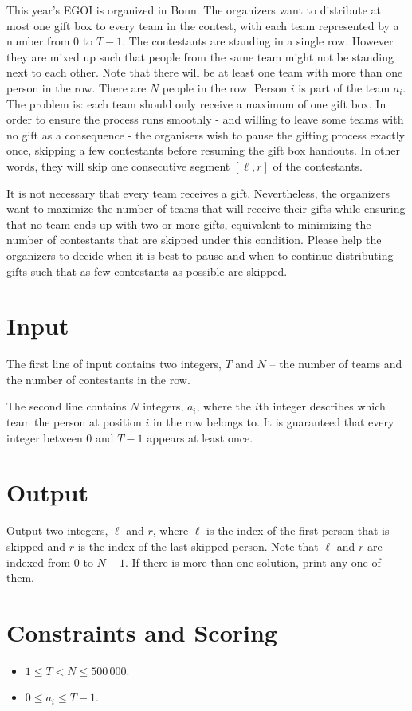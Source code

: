 
This year's EGOI is organized in Bonn.
The organizers want to distribute at most one gift box to every team in the contest, with each team represented by a number from $0$ to $T-1$.
The contestants are standing in a single row. However they are mixed up such that people from the same team might not be standing next to each other. Note that there will be at least one team with more than one person in the row. 
There are $N$ people in the row.
Person $i$ is part of the team $a_i$.
The problem is: each team should only receive a maximum of one gift box.
In order to ensure the process runs smoothly - and willing to leave some teams with no gift as a consequence - the organisers wish to pause the gifting process exactly once, skipping a few contestants before resuming the gift box handouts.
In other words, they will skip one consecutive segment $[\ell, r]$ of the contestants.  

It is not necessary that every team receives a gift.
Nevertheless, the organizers want to maximize the number of teams that will receive their gifts while ensuring that no team ends up with two or more gifts, equivalent to minimizing the number of contestants that are skipped under this condition.
Please help the organizers to decide when it is best to pause and when to continue distributing gifts such that as few contestants as possible are skipped.

\section*{Input}
The first line of input contains two integers, $T$ and $N$ -- the number of teams and the number of contestants in the row.

The second line contains $N$ integers, $a_i$, where the $i$th integer describes which team the person at position $i$ in the row belongs to.
It is guaranteed that every integer between $0$ and $T-1$ appears at least once.

\section*{Output}
Output two integers, $\ell$ and $r$, where $\ell$ is the index of the first person that is skipped and $r$ is the index of the last skipped person.
Note that $\ell$ and $r$ are indexed from $0$ to $N-1$.
If there is more than one solution, print any one of them.

\section*{Constraints and Scoring}
\begin{itemize}
\item $1 \leq T < N \leq 500\,000$.
\item $0 \leq a_i \leq T-1$.
\end{itemize}

